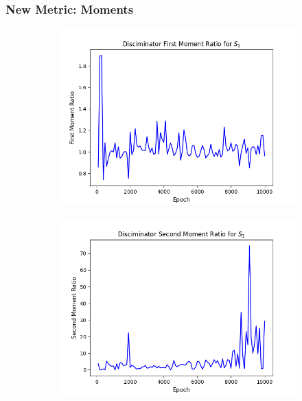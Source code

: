 \documentclass[11pt]{article} %
\begin{document}
\subsubsection{New Metric: Moments}
\begin{figure}[H]
\centering
\begin{minipage}{\textwidth}
  \begin{subfigure}{.5\textwidth}
      \includegraphics[scale=0.5]{./images/moment_1_s1.png}
  \end{subfigure}
  \begin{subfigure}{.5\textwidth}
      \includegraphics[scale=0.5]{./images/moment_2_s1.png}
  \end{subfigure}

\end{minipage}
\end{figure}
\end{document}

